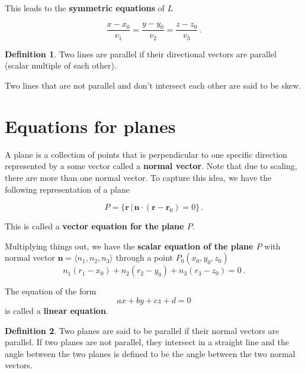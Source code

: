 \documentclass[
]{book}
\theoremstyle{definition}
\newtheorem{definition}{Definition}[chapter]
\theoremstyle{definition}
\theoremstyle{definition}
\theoremstyle{definition}
\theoremstyle{remark}
\begin{document}
This leads to the \textbf{symmetric equations} of \(L\)

\begin{equation*}
    \frac{x - x_0}{v_1} = \frac{y - y_0}{v_2} = \frac{z - z_0}{v_3} \,.
\end{equation*}

\begin{definition}
Two lines are parallel if their directional vectors are parallel (scalar multiple of each other).

Two lines that are not parallel and don't intersect each other are said to be skew.
\end{definition}

\section{Equations for planes}\label{equations-for-planes}

A plane is a collection of points that is perpendicular to one specific direction
represented by a some vector called a \textbf{normal vector}.
Note that due to scaling, there are more than one normal vector.
To capture this idea, we have the following representation of a plane

\begin{equation*}
    P = \{ \mathbf{r} \, | \, \mathbf{n} \cdot (\mathbf{r}- \mathbf{r}_0 ) = 0 \} \,.
\end{equation*}

This is called a \textbf{vector equation for the plane \(P\)}.

Multiplying things out, we have the \textbf{scalar equation of the plane \(P\)} with
normal vector \(\mathbf{n} = \langle n_1, n_2, n_3 \rangle\) through a point \(P_0(x_0, y_0, z_0)\)
\begin{equation*}
    n_1(r_1- x_0) + n_2 (r_2 - y_0) + n_3(r_3 - z_0) = 0 \,.
\end{equation*}

The equation of the form
\begin{equation*}
    ax + by + cz + d = 0 
\end{equation*}
is called a \textbf{linear equation}.

\begin{definition}
Two planes are said to be parallel if their normal vectors are parallel.
If two planes are not parallel, they intersect in a straight line and
the angle between the two planes is defined to be the angle between the
two normal vectors.
\end{definition}
\end{document}
